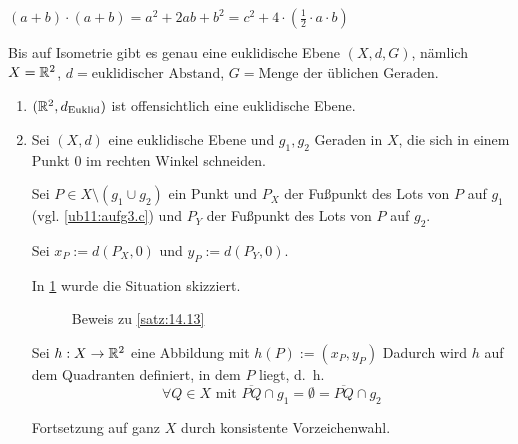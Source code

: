 \begin{beweis}
    $(a+b) \cdot (a+b) = a^2 + 2ab + b^2 = c^2 +4 \cdot (\frac{1}{2} \cdot a \cdot b)$
\end{beweis}

\begin{satz}\label{satz:14.13} %
    Bis auf Isometrie gibt es genau eine euklidische Ebene $(X, d, G)$, nämlich
    $X=\mathbb{R}^2$, $d = \text{euklidischer Abstand}$, $G = \text{Menge der üblichen Geraden}$.
\end{satz}
\goodbreak
\begin{beweis}\leavevmode
    \begin{enumerate}[label=(\roman*)]
        \item $(\mathbb{R}^2, d_\text{Euklid})$ ist offensichtlich eine euklidische Ebene.
        \item Sei $(X,d)$ eine euklidische Ebene und $g_1, g_2$ Geraden
              in $X$, die sich in einem Punkt $0$ im rechten Winkel
              schneiden.

              Sei $P \in X \setminus (g_1 \cup g_2)$ ein Punkt und $P_X$ der
              Fußpunkt des Lots von $P$ auf $g_1$ (vgl. \cref{ub11:aufg3.c})
              und $P_Y$ der Fußpunkt des Lots von $P$ auf $g_2$.

              Sei $x_P := d(P_X, 0)$ und $y_P := d(P_Y, 0)$.

              In \cref{fig:14.13.0.1} wurde die Situation skizziert.

            \begin{figure}[htp]
                \centering
                \subfloat[Schritt 1]{
                    \resizebox{0.45\linewidth}{!}{}
                    \label{fig:14.13.1}
                }%
                \subfloat[Schritt 2]{
                    \resizebox{0.45\linewidth}{!}{}
                    \label{fig:14.13.2}
                }%
                \caption{Beweis zu \cref{satz:14.13}}
                \label{fig:14.13.0.1}
            \end{figure}


              Sei $h:X \rightarrow \mathbb{R}^2$ eine Abbildung mit
              $h(P) := (x_P, y_P)$
              Dadurch wird $h$ auf dem Quadranten
              definiert, in dem $P$ liegt, d.~h.
              \[\forall Q \in X \text{ mit } \overline{PQ} \cap g_1 = \emptyset = \overline{PQ} \cap g_2\]

              Fortsetzung auf ganz $X$ durch konsistente Vorzeichenwahl.


\end{enumerate}
\end{beweis}
